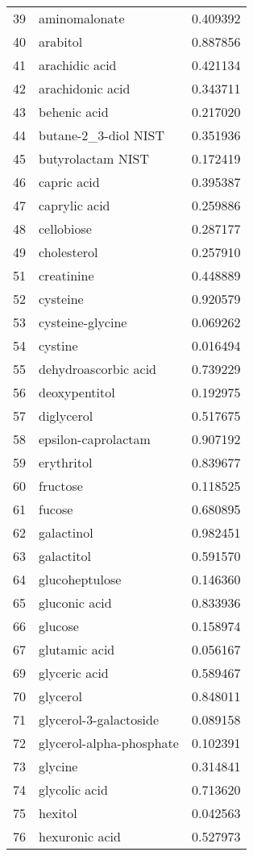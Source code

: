 \begin{tabular}{llr}
39 & aminomalonate & 0.409392 \\
40 & arabitol & 0.887856 \\
41 & arachidic acid & 0.421134 \\
42 & arachidonic acid & 0.343711 \\
43 & behenic acid & 0.217020 \\
44 & butane-2_3-diol NIST & 0.351936 \\
45 & butyrolactam NIST & 0.172419 \\
46 & capric acid & 0.395387 \\
47 & caprylic acid & 0.259886 \\
48 & cellobiose & 0.287177 \\
49 & cholesterol & 0.257910 \\
51 & creatinine & 0.448889 \\
52 & cysteine & 0.920579 \\
53 & cysteine-glycine & 0.069262 \\
54 & cystine & 0.016494 \\
55 & dehydroascorbic acid & 0.739229 \\
56 & deoxypentitol & 0.192975 \\
57 & diglycerol & 0.517675 \\
58 & epsilon-caprolactam & 0.907192 \\
59 & erythritol & 0.839677 \\
60 & fructose & 0.118525 \\
61 & fucose & 0.680895 \\
62 & galactinol & 0.982451 \\
63 & galactitol & 0.591570 \\
64 & glucoheptulose & 0.146360 \\
65 & gluconic acid & 0.833936 \\
66 & glucose & 0.158974 \\
67 & glutamic acid & 0.056167 \\
69 & glyceric acid & 0.589467 \\
70 & glycerol & 0.848011 \\
71 & glycerol-3-galactoside & 0.089158 \\
72 & glycerol-alpha-phosphate & 0.102391 \\
73 & glycine & 0.314841 \\
74 & glycolic acid & 0.713620 \\
75 & hexitol & 0.042563 \\
76 & hexuronic acid & 0.527973 \\

\end{tabular}
